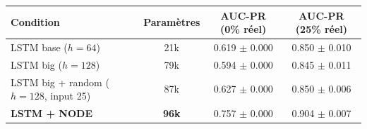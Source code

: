 \begin{tabular}{lccc}
\toprule
Condition & Paramètres & AUC-PR (0\% réel) & AUC-PR (25\% réel) \\
\midrule
LSTM base ($h=64$) & 21k & 0.619 $\pm$ 0.000 & 0.850 $\pm$ 0.010 \\
LSTM big ($h=128$) & 79k & 0.594 $\pm$ 0.000 & 0.845 $\pm$ 0.011 \\
LSTM big + random ($h=128$, input 25) & 87k & 0.627 $\pm$ 0.000 & 0.850 $\pm$ 0.006 \\
\textbf{LSTM + NODE} & \textbf{96k} & 0.757 $\pm$ 0.000 & 0.904 $\pm$ 0.007 \\
\bottomrule
\end{tabular}